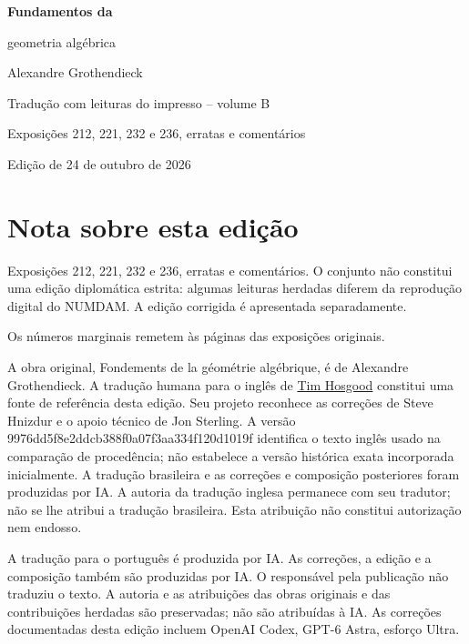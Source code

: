 \documentclass[11pt,twoside,openany]{book}
\numberwithin{equation}{section}
\theoremstyle{plain}
\theoremstyle{definition}
\theoremstyle{remark}
\begin{document}
\frontmatter
\begin{titlepage}
\centering
\vspace*{0.13\textheight}
{\Huge\bfseries Fundamentos da\par geometria algébrica\par}
\vspace{1.5\baselineskip}
{\Large Alexandre Grothendieck\par}
\vfill
{\Large Tradução com leituras do impresso -- volume B\par}
\vspace{\baselineskip}
{\large Exposições 212, 221, 232 e 236, erratas e comentários\par}
\vspace{1.5\baselineskip}
{\normalsize Edição de 24 de outubro de 2026\par}
\end{titlepage}
\chapter*{Nota sobre esta edição}
Exposições 212, 221, 232 e 236, erratas e comentários. O conjunto não constitui uma edição diplomática estrita: algumas leituras herdadas diferem da reprodução digital do NUMDAM. A edição corrigida é apresentada separadamente.

Os números marginais remetem às páginas das exposições originais.

A obra original, Fondements de la géométrie algébrique, é de Alexandre Grothendieck. A tradução humana para o inglês de \href{https://github.com/thosgood/fga/tree/9976dd5f8e2ddcb388f0a07f3aa334f120d1019f}{Tim Hosgood} constitui uma fonte de referência desta edição. Seu projeto reconhece as correções de Steve Hnizdur e o apoio técnico de Jon Sterling. A versão 9976dd5f8e2ddcb388f0a07f3aa334f120d1019f identifica o texto inglês usado na comparação de procedência; não estabelece a versão histórica exata incorporada inicialmente. A tradução brasileira e as correções e composição posteriores foram produzidas por IA. A autoria da tradução inglesa permanece com seu tradutor; não se lhe atribui a tradução brasileira. Esta atribuição não constitui autorização nem endosso.

A tradução para o português é produzida por IA. As correções, a edição e a composição também são produzidas por IA. O responsável pela publicação não traduziu o texto. A autoria e as atribuições das obras originais e das contribuições herdadas são preservadas; não são atribuídas à IA. As correções documentadas desta edição incluem OpenAI Codex, GPT-6 Astra, esforço Ultra.
\end{document}
